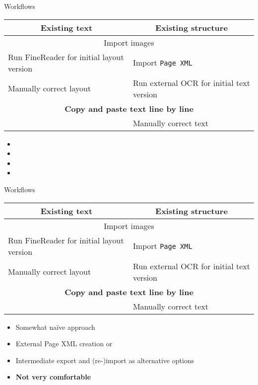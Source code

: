 \documentclass{bbawslides}
\begin{document}
\begin{bbawslide}{Workflows}
  \vspace*{2mm}%
  \centerslidestrue%
  \begin{center}
    \begin{tabular}{|l|l|}
      \hline
      \multicolumn{1}{|c|}{\textbf{Existing text}} & \multicolumn{1}{c|}{\textbf{Existing structure}} \\
      \hline
      \hline
      \multicolumn{2}{|c|}{Import images} \\
      \hline
      Run FineReader for initial layout version & Import \texttt{Page XML} \\
      \hline
      Manually correct layout & Run external OCR for initial text version \\
      \hline
      \multicolumn{2}{|c|}{\bf Copy and paste text line by line} \\
      \hline
      & Manually correct text \\
      \hline
    \end{tabular}
  \end{center}
  \begin{itemize}
    \item
    \item
    \item
    \item
  \end{itemize}
\end{bbawslide}

\begin{bbawslide}{Workflows}
  \vspace*{2mm}%
  \centerslidestrue%
  \begin{center}
    \begin{tabular}{|l|l|}
      \hline
      \multicolumn{1}{|c|}{\textbf{Existing text}} & \multicolumn{1}{c|}{\textbf{Existing structure}} \\
      \hline
      \hline
      \multicolumn{2}{|c|}{Import images} \\
      \hline
      Run FineReader for initial layout version & Import \texttt{Page XML} \\
      \hline
      Manually correct layout & Run external OCR for initial text version \\
      \hline
      \multicolumn{2}{|c|}{\bf Copy and paste text line by line} \\
      \hline
      & Manually correct text \\
      \hline
    \end{tabular}
  \end{center}
  \begin{itemize}
    \item Somewhat na\"{i}ve approach
    \item External Page XML creation or
    \item Intermediate export and (re-)import as alternative options
    \item \textbf{Not very comfortable}
  \end{itemize}
\end{bbawslide}
\end{document}
